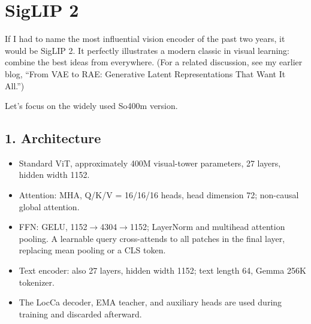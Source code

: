 \clearpage
{}
\setlength{\paperwidth}{210mm}
\setlength{\paperheight}{297mm}
\setlength{\pdfpagewidth}{210mm}
\setlength{\pdfpageheight}{297mm}
\fancyhfoffset{0pt}
\linespread{1.05}\fontsize{10.5pt}{12pt}\selectfont
\setlength{\parskip}{0.26em}
\setlength{\emergencystretch}{2em}
\setlength{\abovedisplayskip}{7pt plus 2pt minus 2pt}
\setlength{\belowdisplayskip}{7pt plus 2pt minus 2pt}

\section{SigLIP 2}
If I had to name the most influential vision encoder of the past two years, it would be SigLIP 2.\allowbreak{} It perfectly illustrates a modern classic in visual learning: combine the best ideas from everywhere.\allowbreak{} (For a related discussion, see my earlier blog, “From VAE to RAE: Generative Latent Representations That Want It All.\allowbreak{}”)\par
Let's focus on the widely used So400m version.\allowbreak{}\par
{}
\subsection{1.\allowbreak{} Architecture}
\begin{itemize}
\item Standard ViT, approximately 400M visual-\allowbreak{}tower parameters, 27 layers, hidden width 1152.\allowbreak{}
\item Attention: MHA, Q/\allowbreak{}K/\allowbreak{}V =\allowbreak{} 16/\allowbreak{}16/\allowbreak{}16 heads, head dimension 72; non-\allowbreak{}causal global attention.\allowbreak{}
\item FFN: GELU, 1152\(\rightarrow\)4304\(\rightarrow\)1152; LayerNorm and multihead attention pooling.\allowbreak{} A learnable query cross-\allowbreak{}attends to all patches in the final layer, replacing mean pooling or a CLS token.\allowbreak{}
\item Text encoder: also 27 layers, hidden width 1152; text length 64, Gemma 256K tokenizer.\allowbreak{}
\item The LocCa decoder, EMA teacher, and auxiliary heads are used during training and discarded afterward.\allowbreak{}
\end{itemize}
